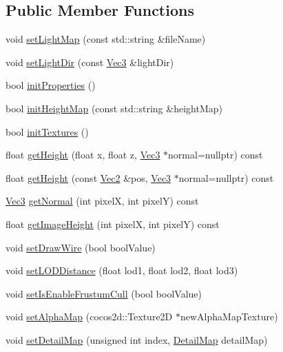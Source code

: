 \subsection*{Public Member Functions}
\begin{DoxyCompactItemize}
\item 
void \hyperlink{classTerrain_a296f207c5fae616a75099156ef8cd0ac}{set\+Light\+Map} (const std\+::string \&file\+Name)
\item 
void \hyperlink{classTerrain_a4fb4d880c5033dcbf89f69ceddf5f8b0}{set\+Light\+Dir} (const \hyperlink{classVec3}{Vec3} \&light\+Dir)
\item 
bool \hyperlink{classTerrain_ac568863efe254e443ea7dfdf7be4113b}{init\+Properties} ()
\item 
bool \hyperlink{classTerrain_a4217303ce95e5a1d0d591dd2ce178623}{init\+Height\+Map} (const std\+::string \&height\+Map)
\item 
bool \hyperlink{classTerrain_af88878ee2f37979ede7656062e19190f}{init\+Textures} ()
\item 
float \hyperlink{classTerrain_ace35b0aef83e27883476dfb44bf473aa}{get\+Height} (float x, float z, \hyperlink{classVec3}{Vec3} $\ast$normal=nullptr) const
\item 
float \hyperlink{classTerrain_ada6082bfb0b0dabc5f6c2e37b984a77e}{get\+Height} (const \hyperlink{classVec2}{Vec2} \&pos, \hyperlink{classVec3}{Vec3} $\ast$normal=nullptr) const
\item 
\hyperlink{classVec3}{Vec3} \hyperlink{classTerrain_aa10abc4834b767de95d47cb67ac5dd23}{get\+Normal} (int pixelX, int pixelY) const
\item 
float \hyperlink{classTerrain_adbe691cc944f4d85745e2ab1f1f4f8ff}{get\+Image\+Height} (int pixelX, int pixelY) const
\item 
void \hyperlink{classTerrain_ae29ad24c1f6056a45dd8fafb480bdff8}{set\+Draw\+Wire} (bool bool\+Value)
\item 
void \hyperlink{classTerrain_acffb1ca57d78d5aa643281d34bf0bf1b}{set\+L\+O\+D\+Distance} (float lod1, float lod2, float lod3)
\item 
void \hyperlink{classTerrain_a27509ae8fd97c911b44f3f21d37761e1}{set\+Is\+Enable\+Frustum\+Cull} (bool bool\+Value)
\item 
void \hyperlink{classTerrain_a10a40e89dd343591a43ab2a1069cef54}{set\+Alpha\+Map} (cocos2d\+::\+Texture2D $\ast$new\+Alpha\+Map\+Texture)
\item 
void \hyperlink{classTerrain_a13ab12df5850aab66f6f45e396c4f169}{set\+Detail\+Map} (unsigned int index, \hyperlink{structTerrain_1_1DetailMap}{Detail\+Map} detail\+Map)

\end{DoxyCompactItemize}
